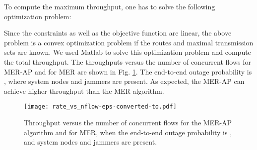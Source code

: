 \documentclass[10pt,journal]{IEEEtran}
\theoremstyle{definition}
\begin{document}
To compute the maximum throughput, one has to solve the following optimization problem:

Since the constraints as well as the objective function are linear, the above problem is a convex optimization problem if the routes  and maximal transmission sets  are known.
We used Matlab to solve this optimization problem and compute the total throughput.
The throughputs versus the number of concurrent flows for MER-AP and for MER are shown in Fig. \ref{fig:rate_vs_nflow}.
 The end-to-end outage probability is , where  system nodes and  jammers are present. 
As expected,  the MER-AP can achieve higher throughput than the MER algorithm. 
\begin{figure}
\begin{center}
 \texttt{[image: rate\_vs\_nflow-eps-converted-to.pdf]}
 \end{center}
 \caption{Throughput versus the number of concurrent flows for the MER-AP algorithm and for MER, when
 the end-to-end outage probability is , and  system nodes and  jammers are present. 
 }
\label{fig:rate_vs_nflow}
 \end{figure}
\end{document}
